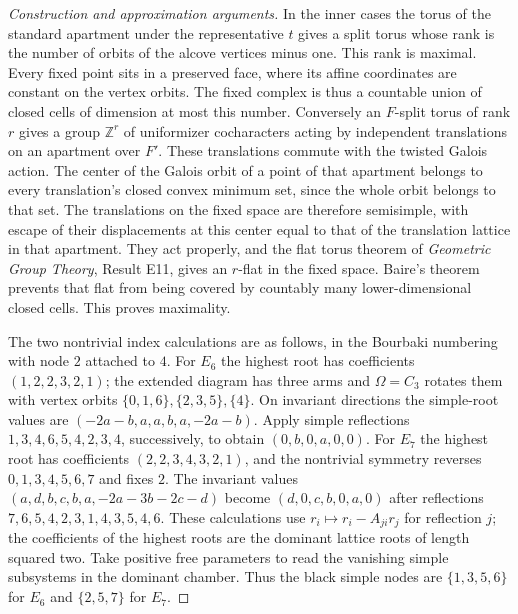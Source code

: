 \documentclass[11pt,a4paper,openany,oneside]{book}
\theoremstyle{resultstyle}
\theoremstyle{definition}
\numberwithin{equation}{chapter}
\begin{document}
\begin{proof}[Construction and approximation arguments]
In the inner cases the torus of the standard apartment under
the representative \(t\) gives a split torus whose rank is
the number of orbits of the alcove vertices minus one. This
rank is maximal. Every fixed point sits in a preserved face,
where its affine coordinates are constant on the vertex
orbits. The fixed complex is thus a countable union of closed
cells of dimension at most this number. Conversely an \(F\)-split
torus of rank \(r\) gives a group \(\mathbb Z^r\) of uniformizer
cocharacters acting by independent translations on an apartment
over \(F'\). These translations commute with the twisted Galois
action. The center of the Galois orbit of a point of that
apartment belongs to every translation's closed convex minimum
set, since the whole orbit belongs to that set. The translations
on the fixed space are therefore semisimple, with escape of
their displacements at this center equal to that of the
translation lattice in that apartment. They act properly,
and the flat torus theorem of \emph{Geometric Group Theory},
Result E11, gives an \(r\)-flat in the fixed space. Baire's
theorem prevents that flat from being covered by countably
many lower-dimensional closed cells. This proves maximality.

The two nontrivial index calculations are as follows, in the
Bourbaki numbering with node \(2\) attached to \(4\). For
\(E_6\) the highest root has coefficients
\((1,2,2,3,2,1)\); the extended diagram has three arms and
\(\Omega=C_3\) rotates them with vertex orbits
\(\{0,1,6\},\{2,3,5\},\{4\}\). On invariant directions the
simple-root values are \((-2a-b,a,a,b,a,-2a-b)\).
Apply simple reflections \(1,3,4,6,5,4,2,3,4\), successively,
to obtain \((0,b,0,a,0,0)\).
For \(E_7\) the highest root has coefficients
\((2,2,3,4,3,2,1)\), and the nontrivial symmetry reverses
\(0,1,3,4,5,6,7\) and fixes \(2\). The invariant values
\((a,d,b,c,b,a,-2a-3b-2c-d)\) become
\((d,0,c,b,0,a,0)\) after reflections
\(7,6,5,4,2,3,1,4,3,5,4,6\).
These calculations use \(r_i\mapsto r_i-A_{ji}r_j\)
for reflection \(j\); the coefficients of the highest roots
are the dominant lattice roots of length squared two.
Take positive free parameters to read the vanishing simple
subsystems in the dominant chamber. Thus the black simple
nodes are \(\{1,3,5,6\}\) for \(E_6\) and \(\{2,5,7\}\)
for \(E_7\).


\end{proof}
\end{document}
